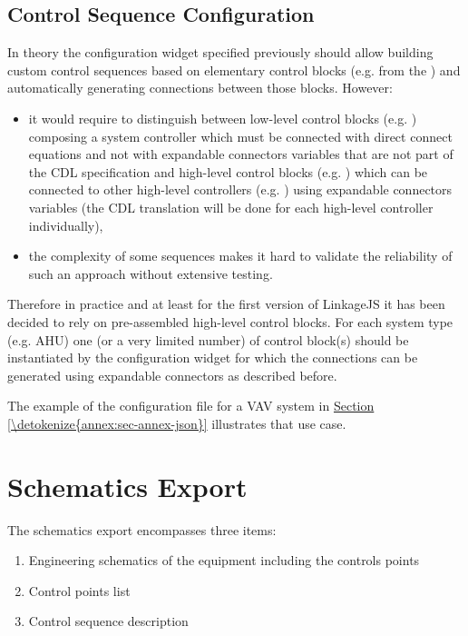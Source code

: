 \documentclass[letterpaper,10pt, openany,english]{sphinxmanual}
\begin{document}
\subsection{Control Sequence Configuration}
\label{\detokenize{requirements:control-sequence-configuration}}
In theory the configuration widget specified previously should allow building custom control sequences based on elementary control blocks (e.g. from the ) and automatically generating connections between those blocks. However:
\begin{itemize}
\item {} 
it would require to distinguish between low-level control blocks (e.g. ) composing a system controller \textendash{} which must be connected with direct connect equations and not with expandable connectors variables that are not part of the CDL specification \textendash{} and high-level control blocks (e.g. ) \textendash{} which can be connected to other high-level controllers (e.g. ) using expandable connectors variables (the CDL translation will be done for each high-level controller individually),

\item {} 
the complexity of some sequences makes it hard to validate the reliability of such an approach without extensive testing.

\end{itemize}

Therefore in practice and at least for the first version of LinkageJS it has been decided to rely on pre-assembled high-level control blocks. For each system type (e.g. AHU) one (or a very limited number) of control block(s) should be instantiated by the configuration widget for which the connections can be generated using expandable connectors as described before.

The example of the configuration file for a VAV system in \hyperref[\detokenize{annex:sec-annex-json}]{Section \ref{\detokenize{annex:sec-annex-json}}} illustrates that use case.


\section{Schematics Export}
\label{\detokenize{requirements:schematics-export}}\label{\detokenize{requirements:sec-schematics-export}}
The schematics export encompasses three items:
\begin{enumerate}
%
\item {} 
Engineering schematics of the equipment including the controls points

\item {} 
Control points list

\item {} 
Control sequence description

\end{enumerate}
\end{document}
